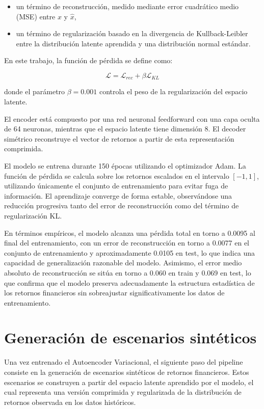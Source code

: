 \begin{itemize}
\item un término de reconstrucción, medido mediante error cuadrático medio (MSE) entre \(x\) y \(\hat{x}\),
\item un término de regularización basado en la divergencia de Kullback-Leibler entre la distribución latente aprendida y una distribución normal estándar.
\end{itemize}

En este trabajo, la función de pérdida se define como:

\[
\mathcal{L} = \mathcal{L}_{rec} + \beta \mathcal{L}_{KL}
\]

donde el parámetro \(\beta = 0.001\) controla el peso de la regularización del espacio latente.

El encoder está compuesto por una red neuronal feedforward con una capa oculta de 64 neuronas, mientras que el espacio latente tiene dimensión 8. El decoder simétrico reconstruye el vector de retornos a partir de esta representación comprimida.

El modelo se entrena durante 150 épocas utilizando el optimizador Adam. La función de pérdida se calcula sobre los retornos escalados en el intervalo \([-1, 1]\), utilizando únicamente el conjunto de entrenamiento para evitar fuga de información. El aprendizaje converge de forma estable, observándose una reducción progresiva tanto del error de reconstrucción como del término de regularización KL.

En términos empíricos, el modelo alcanza una pérdida total en torno a 0.0095 al final del entrenamiento, con un error de reconstrucción en torno a 0.0077 en el conjunto de entrenamiento y aproximadamente 0.0105 en test, lo que indica una capacidad de generalización razonable del modelo. Asimismo, el error medio absoluto de reconstrucción se sitúa en torno a 0.060 en train y 0.069 en test, lo que confirma que el modelo preserva adecuadamente la estructura estadística de los retornos financieros sin sobreajustar significativamente los datos de entrenamiento.


\section{Generación de escenarios sintéticos}

Una vez entrenado el Autoencoder Variacional, el siguiente paso del pipeline consiste en la generación de escenarios sintéticos de retornos financieros. Estos escenarios se construyen a partir del espacio latente aprendido por el modelo, el cual representa una versión comprimida y regularizada de la distribución de retornos observada en los datos históricos.

